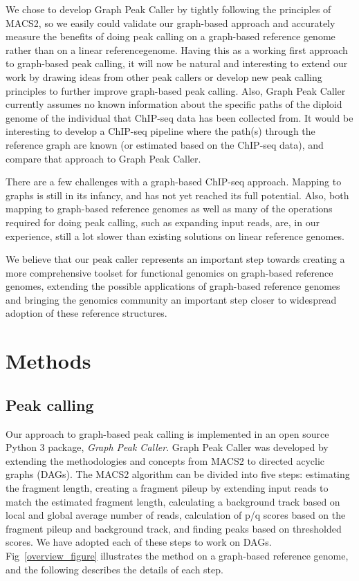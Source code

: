 \documentclass[10pt,letterpaper]{article}
\begin{document}
We chose to develop Graph Peak Caller by tightly following the principles of MACS2, so we easily could validate our graph-based approach and accurately measure the benefits of doing peak calling on a graph-based reference genome rather than on a linear referencegenome. Having this as a working first approach to graph-based peak calling, it will now be natural and interesting  to extend our work by drawing ideas from other peak callers or develop new peak calling principles to further improve graph-based peak calling. Also, Graph Peak Caller currently assumes no known information about the specific paths of the diploid genome of the individual that ChIP-seq data has been collected from. It would be interesting to develop a ChIP-seq pipeline where the path(s) through the reference graph are known (or estimated based on the ChIP-seq data), and compare that approach to Graph Peak Caller.

There are a few challenges with a graph-based ChIP-seq approach. Mapping to graphs is still in its infancy, and has not yet reached its full potential. Also, both mapping to graph-based reference genomes as well as many of the operations required for doing peak calling, such as expanding input reads, are, in our experience, still a lot slower than existing solutions on linear reference genomes. 

We believe that our peak caller represents an important step towards creating a more comprehensive toolset for functional genomics on graph-based reference genomes, extending the possible applications of graph-based reference genomes and bringing the genomics community an important step closer to widespread adoption of these reference structures.

\section*{Methods}
\subsection*{Peak calling}
Our approach to graph-based peak calling is implemented in an open source Python 3 package, \emph{Graph Peak Caller}. Graph Peak Caller was developed by extending the methodologies and concepts from MACS2 to directed acyclic graphs (DAGs). The MACS2 algorithm can be divided into five steps: estimating the fragment length, creating a fragment pileup by extending input reads to match the estimated fragment length, calculating a background track based on local and global average number of reads, calculation of p/q scores based on the fragment pileup and background track, and finding peaks based on thresholded scores. We have adopted each of these steps to work on DAGs. Fig~\ref{overview_figure} illustrates the method on a graph-based reference genome, and the following describes the details of each step.
\end{document}
